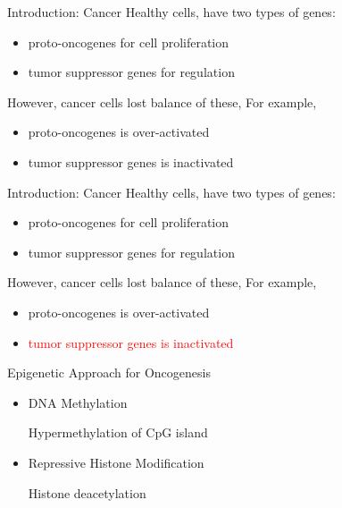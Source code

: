 \documentclass{beamer}
\begin{document}
    \begin{frame}{Introduction: Cancer}
        Healthy cells, have two types of genes:
        \begin{itemize}
            \item proto-oncogenes for cell proliferation
            \item tumor suppressor genes for regulation
        \end{itemize}

        However, cancer cells lost balance of these, For example,
        \begin{itemize}
            \item proto-oncogenes is over-activated
            \item tumor suppressor genes is inactivated
        \end{itemize}
    \end{frame}

    \begin{frame}{Introduction: Cancer}
        Healthy cells, have two types of genes:
        \begin{itemize}
            \item proto-oncogenes for cell proliferation
            \item tumor suppressor genes for regulation
        \end{itemize}

        However, cancer cells lost balance of these, For example,
        \begin{itemize}
            \item proto-oncogenes is over-activated
            \item \textcolor{red}{tumor suppressor genes is inactivated}
        \end{itemize}
    \end{frame}

    \begin{frame}{Epigenetic Approach for Oncogenesis}
        \begin{itemize}
            \item DNA Methylation
            
                  \vspace{1em}
                  Hypermethylation of CpG island

            \vspace{3em}
            \item Repressive Histone Modification
                  
                  \vspace{1em}
                  Histone deacetylation
        \end{itemize}
    \end{frame}
\end{document}
